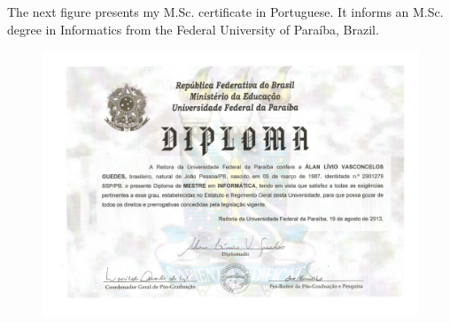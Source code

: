 \documentclass[10pt,a4paper,sans,colorlinks]{moderncv}
\begin{document}
The next figure presents my M.Sc. certificate in Portuguese.
It informs an M.Sc. degree in Informatics from the Federal University of Paraíba, Brazil.

\begin{figure}
    \centering
    \includegraphics[align=t,width=\textwidth,height=0.3\paperheight, keepaspectratio=true]{certificates/msc-certificate.pdf}
\end{figure}
\end{document}

